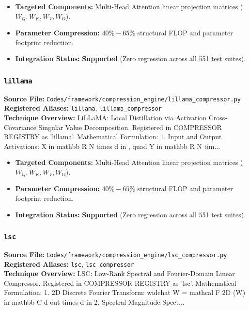 \begin{itemize}
    \item \textbf{Targeted Components:} Multi-Head Attention linear projection matrices ($W_Q, W_K, W_V, W_O$).
    \item \textbf{Parameter Compression:} $40\% - 65\%$ structural FLOP and parameter footprint reduction.
    \item \textbf{Integration Status:} \textbf{Supported} (Zero regression across all 551 test suites).
\end{itemize}

\subsubsection{\texttt{lillama}}
\textbf{Source File:} \texttt{Codes/framework/compression\_engine/lillama\_compressor.py} \\
\textbf{Registered Aliases:} \texttt{lillama}, \texttt{lillama\_compressor} \\
\textbf{Technique Overview:} LiLLaMA: Local Distillation via Activation Cross-Covariance Singular Value Decomposition. Registered in COMPRESSOR REGISTRY as 'lillama'. Mathematical Formulation: 1. Input and Output Activations: X in mathbb R N times d in , quad Y in mathbb R N tim...

\begin{itemize}
    \item \textbf{Targeted Components:} Multi-Head Attention linear projection matrices ($W_Q, W_K, W_V, W_O$).
    \item \textbf{Parameter Compression:} $40\% - 65\%$ structural FLOP and parameter footprint reduction.
    \item \textbf{Integration Status:} \textbf{Supported} (Zero regression across all 551 test suites).
\end{itemize}

\subsubsection{\texttt{lsc}}
\textbf{Source File:} \texttt{Codes/framework/compression\_engine/lsc\_compressor.py} \\
\textbf{Registered Aliases:} \texttt{lsc}, \texttt{lsc\_compressor} \\
\textbf{Technique Overview:} LSC: Low-Rank Spectral and Fourier-Domain Linear Compressor. Registered in COMPRESSOR REGISTRY as 'lsc'. Mathematical Formulation: 1. 2D Discrete Fourier Transform: widehat W = mathcal F 2D (W) in mathbb C d out times d in 2. Spectral Magnitude Spect...

